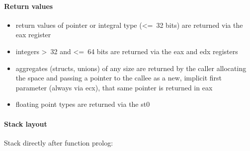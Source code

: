 \paragraph{Return values}

\begin{itemize}
\item return values of pointer or integral type (\textless=\ 32 bits) are returned via the eax register
\item integers \textgreater\ 32 and \textless=\ 64 bits are returned via the eax and edx registers
\item aggregates (structs, unions) of any size are returned by the caller allocating the space and
passing a pointer to the callee as a new, implicit first parameter (always via ecx), that same pointer is returned in eax
\item floating point types are returned via the st0
\end{itemize}


\pagebreak

\paragraph{Stack layout}

Stack directly after function prolog:\\

